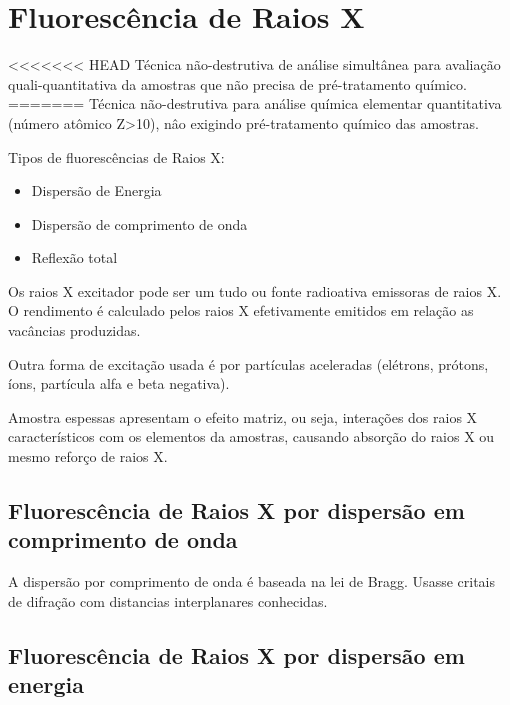 \section{Fluorescência de Raios X}

<<<<<<< HEAD
Técnica não-destrutiva de análise simultânea para avaliação 
quali-quantitativa da amostras que não precisa de pré-tratamento químico. 
=======
Técnica não-destrutiva para análise química elementar 
quantitativa (número atômico Z>10), nâo exigindo pré-tratamento químico das amostras. 


Tipos de fluorescências de Raios X:
\begin{itemize}
  \item Dispersão de Energia
  \item Dispersão de comprimento de onda
  \item Reflexão total
\end{itemize}

Os raios X excitador pode ser um tudo ou fonte radioativa emissoras de raios X.
O rendimento é calculado pelos raios X efetivamente emitidos em 
relação as vacâncias produzidas.

Outra forma de excitação usada é por partículas aceleradas 
(elétrons, prótons, íons, partícula alfa e beta negativa).

Amostra espessas apresentam o efeito matriz, ou seja, interações dos 
raios X característicos com os elementos da amostras, causando 
absorção do raios X ou mesmo reforço de raios X.

\subsection{Fluorescência de Raios X por dispersão em comprimento de onda}

A dispersão por comprimento de onda é baseada na lei de Bragg.
Usasse critais de difração com distancias interplanares conhecidas.
  

\subsection{Fluorescência de Raios X por dispersão em energia}

